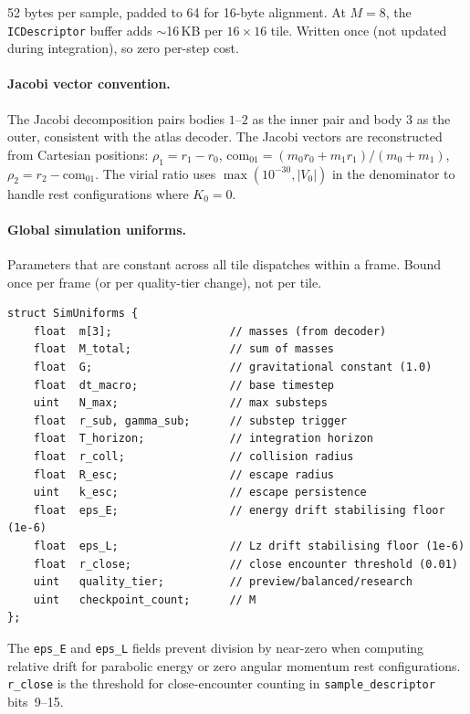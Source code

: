 \documentclass[11pt]{report}
\begin{document}
52 bytes per sample, padded to 64 for 16-byte alignment. At $M=8$, the \texttt{ICDescriptor} buffer adds $\sim$16\,KB per $16\times 16$ tile. Written once (not updated during integration), so zero per-step cost.

\paragraph{Jacobi vector convention.} The Jacobi decomposition pairs bodies $1$--$2$ as the inner pair and body $3$ as the outer, consistent with the atlas decoder. The Jacobi vectors are reconstructed from Cartesian positions: $\rho_1 = r_1 - r_0$, $\text{com}_{01} = (m_0 r_0 + m_1 r_1)/(m_0 + m_1)$, $\rho_2 = r_2 - \text{com}_{01}$. The virial ratio uses $\max(10^{-30}, |V_0|)$ in the denominator to handle rest configurations where $K_0 = 0$.


\paragraph{Global simulation uniforms.}

Parameters that are constant across all tile dispatches within a frame. Bound once per frame (or per quality-tier change), not per tile.

\begin{verbatim}
struct SimUniforms {
    float  m[3];                  // masses (from decoder)
    float  M_total;               // sum of masses
    float  G;                     // gravitational constant (1.0)
    float  dt_macro;              // base timestep
    uint   N_max;                 // max substeps
    float  r_sub, gamma_sub;      // substep trigger
    float  T_horizon;             // integration horizon
    float  r_coll;                // collision radius
    float  R_esc;                 // escape radius
    uint   k_esc;                 // escape persistence
    float  eps_E;                 // energy drift stabilising floor (1e-6)
    float  eps_L;                 // Lz drift stabilising floor (1e-6)
    float  r_close;               // close encounter threshold (0.01)
    uint   quality_tier;          // preview/balanced/research
    uint   checkpoint_count;      // M
};
\end{verbatim}

The \texttt{eps\_E} and \texttt{eps\_L} fields prevent division by near-zero when computing relative drift for parabolic energy or zero angular momentum rest configurations. \texttt{r\_close} is the threshold for close-encounter counting in \texttt{sample\_descriptor} bits~9--15.
\end{document}
